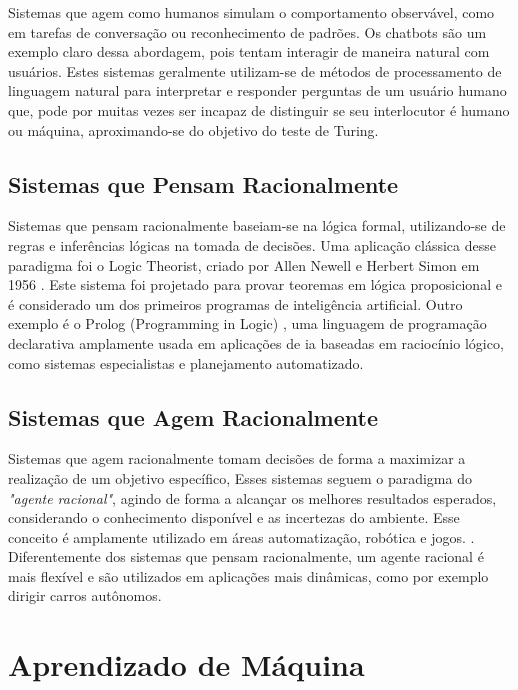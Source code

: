 Sistemas que agem como humanos simulam o comportamento observável, como em tarefas de conversação ou reconhecimento de padrões. Os chatbots são um exemplo claro dessa abordagem, pois tentam interagir de maneira natural com usuários. Estes sistemas geralmente utilizam-se de métodos de processamento de linguagem natural para interpretar e responder perguntas de um usuário humano que, pode por muitas vezes ser incapaz de distinguir se seu interlocutor é humano ou máquina, aproximando-se do objetivo do teste de Turing.

\subsection{Sistemas que Pensam Racionalmente}\label{subsec:ia3}

Sistemas que pensam racionalmente baseiam-se na lógica formal, utilizando-se de regras e inferências lógicas na tomada de decisões. Uma aplicação clássica desse paradigma foi o Logic Theorist, criado por Allen Newell e Herbert Simon em 1956 \cite{NewellSimon1976}. Este sistema foi projetado para provar teoremas em lógica proposicional e é considerado um dos primeiros programas de inteligência artificial. Outro exemplo é o Prolog (Programming in Logic) \cite{Colmerauer1973}, uma linguagem de programação declarativa amplamente usada em aplicações de \gls{ia} baseadas em raciocínio lógico, como sistemas especialistas e planejamento automatizado.

\subsection{Sistemas que Agem Racionalmente}\label{subsec:ia4}

Sistemas que agem racionalmente tomam decisões de forma a maximizar a realização de um objetivo específico, Esses sistemas seguem o paradigma do \textit{"agente racional"}, agindo de forma a alcançar os melhores resultados esperados, considerando o conhecimento disponível e as incertezas do ambiente. Esse conceito é amplamente utilizado em áreas automatização, robótica e jogos. \cite{Poole2010}. Diferentemente dos sistemas que pensam racionalmente, um agente racional é mais flexível e são utilizados em aplicações mais dinâmicas, como por exemplo dirigir carros autônomos.

\section{Aprendizado de Máquina}\label{subsec:ml}

